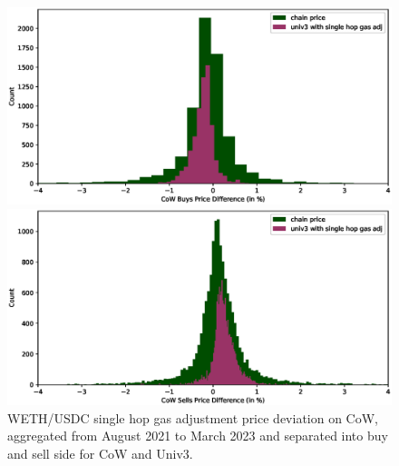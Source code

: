 \documentclass[a4paper,10pt]{article}
\theoremstyle{remark}
\begin{document}
%
\begin{figure}
  \begin{center}
    \begin{minipage}{.5\textwidth}
      \begin{center}
        \includegraphics[width=.9\textwidth]
          {diagrams/weth_buy_hist.eps}
      \end{center}
   \end{minipage}%
    \begin{minipage}{.5\textwidth}
      \begin{center}
        \includegraphics[width=.9\textwidth]
          {diagrams/weth_sell_hist.eps}
      \end{center}
    \end{minipage}
  \end{center}
  \caption{WETH/USDC single hop gas adjustment price deviation on CoW, aggregated from August 2021 to March 2023 and separated into buy and sell side for CoW and Univ3.}
\end{figure}
\end{document}
